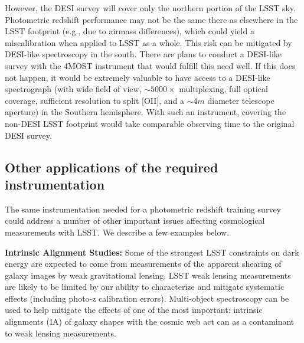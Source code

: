 However, the DESI survey will cover only the northern portion of the LSST sky.  Photometric redshift performance may not be the same there as elsewhere in the LSST footprint (e.g., due to airmass differences), which could yield a miscalibration when applied to LSST as a whole.  This risk can be mitigated by DESI-like spectroscopy in the south.  There are plans to conduct a DESI-like survey with the 4MOST instrument that would fulfill this need well.  If this does not happen, it would be extremely valuable to have access to a DESI-like spectrograph (with wide field of view, $\sim 5000\times$ multiplexing, full optical coverage, sufficient resolution to split [OII], and a $\sim 4m$ diameter telescope aperture) in the Southern hemisphere.  With such an instrument, covering the non-DESI LSST footprint would take comparable observing time to the original DESI survey.

\subsection{Other applications of the required instrumentation}

The same instrumentation needed for a photometric redshift training survey could address a number of other important issues  affecting cosmological measurements with LSST.  We describe a few examples below.

{\bf Intrinsic Alignment Studies:} Some of the strongest LSST constraints on dark energy are expected to come from measurements of the apparent shearing of galaxy images by weak gravitational lensing.  LSST weak lensing measurements are likely to be limited by our ability to characterize and mitigate systematic effects (including photo-z calibration errors). Multi-object spectroscopy can be used to help mitigate the effects of one of the most important: intrinsic alignments (IA) of galaxy shapes with the cosmic web act can as a contaminant to weak lensing measurements.

